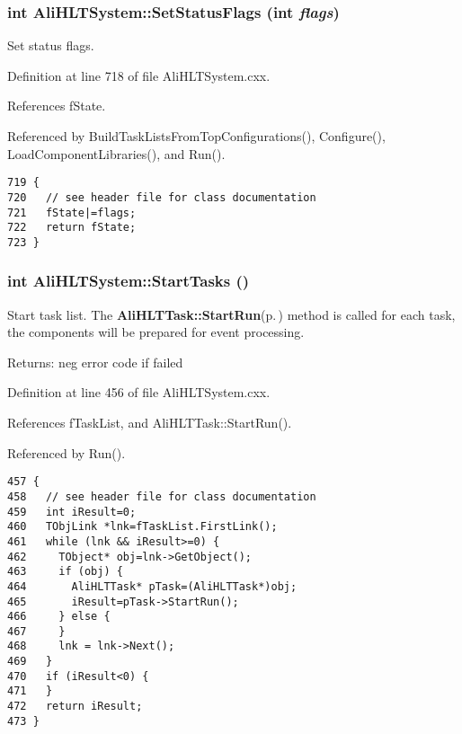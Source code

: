 \subsubsection{\setlength{\rightskip}{0pt plus 5cm}int Ali\-HLTSystem::Set\-Status\-Flags (int {\em flags})\hspace{0.3cm}{\tt  [private]}}\label{classAliHLTSystem_d0}


Set status flags. 

Definition at line 718 of file Ali\-HLTSystem.cxx.

References f\-State.

Referenced by Build\-Task\-Lists\-From\-Top\-Configurations(), Configure(), Load\-Component\-Libraries(), and Run().

\footnotesize\begin{verbatim}719 {
720   // see header file for class documentation
721   fState|=flags;
722   return fState;
723 }
\end{verbatim}\normalsize 


\subsubsection{\setlength{\rightskip}{0pt plus 5cm}int Ali\-HLTSystem::Start\-Tasks ()}\label{classAliHLTSystem_a16}


Start task list. The {\bf Ali\-HLTTask::Start\-Run}{\rm (p.\,\pageref{classAliHLTTask_a18})} method is called for each task, the components will be prepared for event processing. \begin{Desc}
\item[Returns:]neg error code if failed \end{Desc}


Definition at line 456 of file Ali\-HLTSystem.cxx.

References f\-Task\-List, and Ali\-HLTTask::Start\-Run().

Referenced by Run().

\footnotesize\begin{verbatim}457 {
458   // see header file for class documentation
459   int iResult=0;
460   TObjLink *lnk=fTaskList.FirstLink();
461   while (lnk && iResult>=0) {
462     TObject* obj=lnk->GetObject();
463     if (obj) {
464       AliHLTTask* pTask=(AliHLTTask*)obj;
465       iResult=pTask->StartRun();
466     } else {
467     }
468     lnk = lnk->Next();
469   }
470   if (iResult<0) {
471   }
472   return iResult;
473 }
\end{verbatim}\normalsize 


